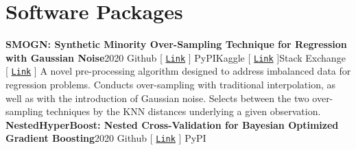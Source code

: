 \documentclass{article}
\begin{document}
    \section*{Software Packages}
        \textbf{SMOGN: Synthetic Minority Over-Sampling Technique for Regression with Gaussian Noise}\hfill{2020}\newline
        \faGithub\space Github [ \href{https://github.com/nickkunz/smogn}{\texttt{Link}} ] \space\faPython\space PyPI\space\faUsers\space Kaggle [ \href{https://www.kaggle.com/aleksandradeis/regression-addressing-extreme-rare-cases}{\texttt{Link}} ]\space\faStackExchange\space Stack Exchange [ \href{https://datascience.stackexchange.com/questions/39232/how-to-make-multiple-regression-perform-better-for-outliers-without-reducing-e/64933#64933}{\texttt{Link}} ]\newline\newline
        A novel pre-processing algorithm designed to address imbalanced data for regression problems. Conducts over-sampling with traditional interpolation, as well as with the introduction of Gaussian noise. Selects between the two over-sampling techniques by the KNN distances underlying a given observation.\newline\newline
        \textbf{NestedHyperBoost: Nested Cross-Validation for Bayesian Optimized Gradient Boosting}\hfill{2020}\newline
        \faGithub\space Github [ \href{https://github.com/nickkunz/nestedhyperboost}{\texttt{Link}} ] \space\faPython\space PyPI\newline\newline
\end{document}

